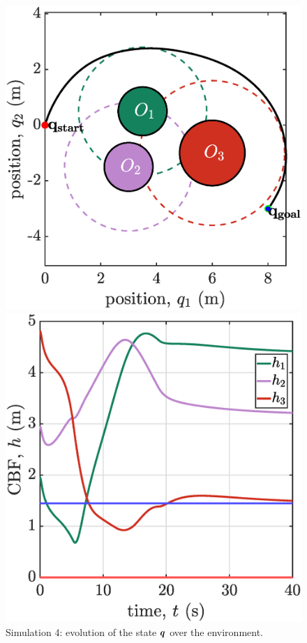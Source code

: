 \begin{figure}[!ht]
    \begin{minipage}[b]{0.46\linewidth}
    \includegraphics[width=\textwidth]{figures/sim4map.eps}
    \caption{\label{fig:sim4map}Simulation 4: evolution of the state ${\boldsymbol{q}}$ over the environment.}
    \end{minipage}
    \hfill
    \begin{minipage}[b]{0.46\linewidth}
    \includegraphics[width=\textwidth]{figures/sim4h.eps}

\end{minipage}
\end{figure}
